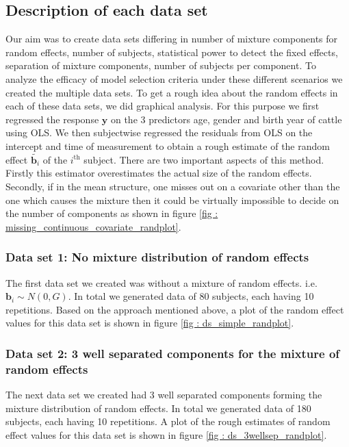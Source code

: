 \subsection{Description of each data set}
Our aim was to create data sets differing in number of mixture components for random effects, number of subjects, statistical power to detect the fixed effects, separation of mixture components, number of subjects per component. To analyze the efficacy of model selection criteria under these different scenarios we created the multiple data sets. To get a rough idea about the random effects in each of these data sets, we did graphical analysis. For this purpose we first regressed the response $\boldsymbol{y}$ on the 3 predictors age, gender and birth year of cattle using OLS. We then subjectwise regressed the residuals from OLS on the intercept and time of measurement to obtain a rough estimate of the random effect $\tilde{\boldsymbol{b}_i}$ of the $i^\text{th}$ subject. There are two important aspects of this method. Firstly this estimator overestimates the actual size of the random effects. Secondly, if in the mean structure, one misses out on a covariate other than the one which causes the mixture then it could be virtually impossible to decide on the number of components as shown in figure \ref{fig : missing_continuous_covariate_randplot}.

\subsubsection{Data set 1: No mixture distribution of random effects}
\label{subsubsec : ds_simple}
The first data set we created was without a mixture of random effects. i.e. $\boldsymbol{b}_i \sim N(0, G)$. In total we generated data of 80 subjects, each having 10 repetitions. Based on the approach mentioned above, a plot of the random effect values for this data set is shown in figure \ref{fig : ds_simple_randplot}.

\subsubsection{Data set 2: 3 well separated components for the mixture of random effects}
\label{subsubsec : ds_3wellsep}
The next data set we created had 3 well separated components forming the mixture distribution of random effects. In total we generated data of 180 subjects, each having 10 repetitions. A plot of the rough estimates of random effect values for this data set is shown in figure \ref{fig : ds_3wellsep_randplot}.

